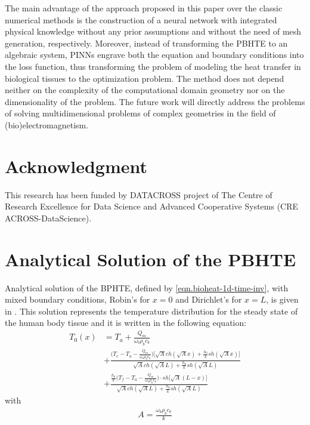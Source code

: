 \documentclass[conference]{IEEEtran}
\begin{document}
The main advantage of the approach proposed in this paper over the classic numerical methods is the construction of a neural network with integrated physical knowledge without any prior assumptions and without the need of mesh generation, respectively. Moreover, instead of transforming the PBHTE to an algebraic system, PINNs engrave both the equation and boundary conditions into the loss function, thus transforming the problem of modeling the heat transfer in biological tissues to the optimization problem. The method does not depend neither on the complexity of the computational domain geometry nor on the dimensionality of the problem. 
The future work will directly address the problems of solving multidimensional problems of complex geometries in the field of (bio)electromagnetism.

\section*{Acknowledgment}
This research has been funded by DATACROSS project of The Centre of Research Excellence for Data Science and Advanced Cooperative Systems (CRE ACROSS-DataScience).

\appendices
\renewcommand{\theequation}{\thesection.\arabic{equation}}
\setcounter{equation}{0}
\section{Analytical Solution of the PBHTE}
\label{ap.an}
Analytical solution of the BPHTE, defined by \eqref{eqn.bioheat-1d-time-inv}, with mixed boundary conditions, Robin's for $x=0$ and Dirichlet's for $x=L$, is given in \cite{deng_bioheat_2002}. This solution represents the temperature distribution for the steady state of the human body tissue and it is written in the following equation:
\begin{equation}
\begin{aligned}
    T_0(x) & =  T_a + \frac{Q_m}{\omega_b \rho_b c_b} \\
     &+ \frac{\Big(T_c - T_a - \frac{Q_m}{\omega_b \rho_b c_b} \Big) \Big[\sqrt{A}ch(\sqrt{A}x) + \frac{h_0}{k}sh(\sqrt{A}x) \Big]}{\sqrt{A}ch(\sqrt{A}L) + \frac{h_0}{k}sh(\sqrt{A}L)}\\
     &+\frac{\frac{h_0}{k}\big(T_f - T_a - \frac{Q_m}{\omega_b \rho_b c_b} \big)\cdot sh\big[\sqrt{A}(L-x)\big]}{\sqrt{A}ch(\sqrt{A}L) + \frac{h_0}{k}sh(\sqrt{A}L)}
    \label{eqn.analytical_sol}
\end{aligned}
\end{equation}
with
\begin{equation}
\begin{aligned}
    A = \frac{\omega_b \rho_b c_b}{k}
    \label{eqn.a}
\end{aligned}
\end{equation}
\end{document}
